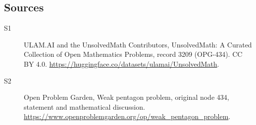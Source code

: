 \documentclass[11pt]{article}
\begin{document}
\subsection{Sources}
\begin{description}
\item[\hypertarget{source:3209:1}{S1}] ULAM.AI and the UnsolvedMath Contributors, UnsolvedMath: A Curated Collection of Open Mathematics Problems, record 3209 (OPG-434). CC BY 4.0. \url{https://huggingface.co/datasets/ulamai/UnsolvedMath}.
\item[\hypertarget{source:3209:2}{S2}] Open Problem Garden, Weak pentagon problem, original node 434, statement and mathematical discussion. \url{https://www.openproblemgarden.org/op/weak_pentagon_problem}.
\end{description}
\label{end:3209}
\end{document}
